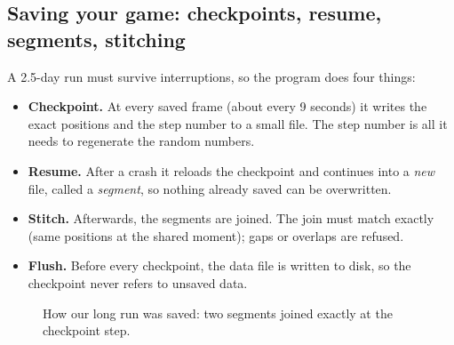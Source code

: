 \documentclass[11pt]{article}
\begin{document}
\subsection{Saving your game: checkpoints, resume, segments, stitching}
A 2.5-day run must survive interruptions, so the program does four things:
\begin{itemize}
\item \textbf{Checkpoint.} At every saved frame (about every 9 seconds) it writes the exact positions and the step number to a small file. The step number is all it needs to regenerate the random numbers.
\item \textbf{Resume.} After a crash it reloads the checkpoint and continues into a \emph{new} file, called a \emph{segment}, so nothing already saved can be overwritten.
\item \textbf{Stitch.} Afterwards, the segments are joined. The join must match exactly (same positions at the shared moment); gaps or overlaps are refused.
\item \textbf{Flush.} Before every checkpoint, the data file is written to disk, so the checkpoint never refers to unsaved data.
\end{itemize}

\begin{figure}[H]\centering
{}
\caption{How our long run was saved: two segments joined exactly at the checkpoint step.}
\end{figure}
\end{document}

